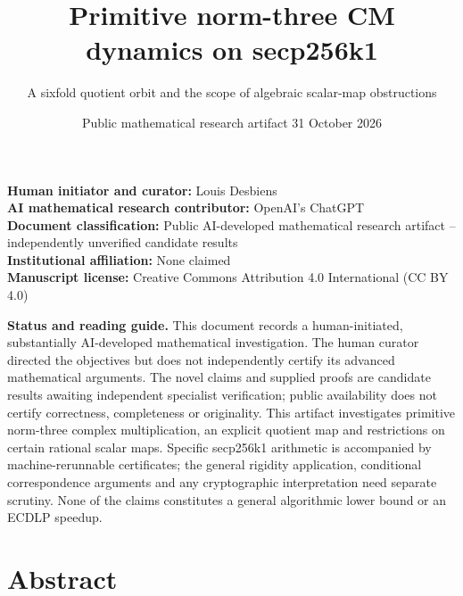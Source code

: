 \documentclass[
  11pt,
  a4paper,
]{article}
\title{Primitive norm-three CM dynamics on secp256k1}
\subtitle{A sixfold quotient orbit and the scope of algebraic scalar-map obstructions}
\author{}
\date{Public mathematical research artifact \textbar{} 31 October 2026}
\begin{document}
\maketitle

\textbf{Human initiator and curator:} Louis Desbiens\\
\textbf{AI mathematical research contributor:} OpenAI's ChatGPT\\
\textbf{Document classification:} Public AI-developed mathematical
research artifact -- independently unverified candidate results\\
\textbf{Institutional affiliation:} None claimed\\
\textbf{Manuscript license:} Creative Commons Attribution 4.0 International (CC BY 4.0)

\textbf{Status and reading guide.} This document records a
human-initiated, substantially AI-developed mathematical investigation.
The human curator directed the objectives but does not independently
certify its advanced mathematical arguments. The novel claims and
supplied proofs are candidate results awaiting independent specialist
verification; public availability does not certify correctness,
completeness or originality. This artifact investigates primitive
norm-three complex multiplication, an explicit quotient map and
restrictions on certain rational scalar maps. Specific secp256k1
arithmetic is accompanied by machine-rerunnable certificates; the
general rigidity application, conditional correspondence arguments and
any cryptographic interpretation need separate scrutiny. None of the
claims constitutes a general algorithmic lower bound or an ECDLP
speedup.

\section{Abstract}\label{abstract}
\end{document}
